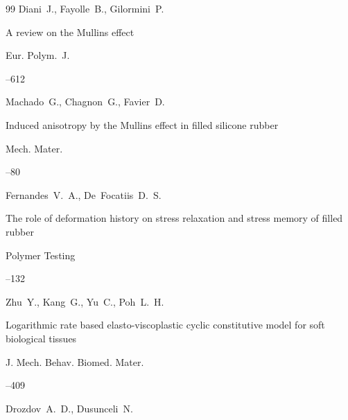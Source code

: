\begin{thebibliography}{99}
\by Diani~J., Fayolle~B., Gilormini~P.

\paper A review on the Mullins effect

\jour Eur. Polym.~J.



--612







\by Machado~G., Chagnon~G., Favier~D. 

\paper Induced anisotropy by the Mullins effect in filled silicone rubber

\jour Mech. Mater.



--80







\by Fernandes~V.~A., De~Focatiis~D.~S.

\paper The role of deformation history on stress relaxation and stress memory of filled rubber

\jour Polymer Testing



--132







\by Zhu~Y., Kang~G., Yu~C., Poh~L.~H. 

\paper Logarithmic rate based elasto-viscoplastic cyclic constitutive model for soft biological tissues

\jour J. Mech. Behav. Biomed. Mater.



--409







\by Drozdov~A.~D., Dusunceli~N.


\end{thebibliography}
